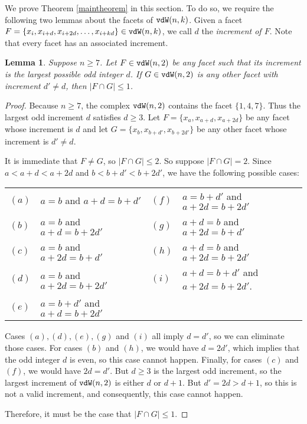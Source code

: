 \documentclass[12pt]{amsart}
\numberwithin{equation}{section}
\newtheorem{lemma}[theorem]{Lemma}
\theoremstyle{definition}
\begin{document}
We prove Theorem \ref{maintheorem} in this section.  To do
so,  we require the following two lemmas about the 
facets of ${\tt vdW}(n,k)$.   
Given  a facet $F=\{x_i,x_{i+d},x_{i+2d},\ldots,x_{i+kd}\} \in {\tt vdW}(n,k)$, 
we call $d$ the {\it increment of $F$}.  Note that every facet has an
associated increment.

\begin{lemma}\label{mainlemma1}
Suppose $n \geq 7$.   Let $F \in {\tt vdW}(n,2)$ be any facet
such that its increment is the largest possible odd integer $d$.
If $G \in {\tt vdW}(n,2)$ is any other facet with increment
$d' \neq d$, then $|F \cap G| \leq 1$.
\end{lemma}

\begin{proof}
Because $n \geq 7$, the complex ${\tt vdW}(n,2)$ contains the facet $\{1,4,7\}$.
Thus the largest odd increment $d$ satisfies $d \geq 3$.  
Let $F = \{x_a,x_{a+d},x_{a+2d}\}$ be any facet whose increment is $d$
and let $G = \{x_b,x_{b+d'},x_{b+2d'}\}$ be any other facet whose
increment is $d' \neq d$.    

It is immediate that $F \neq G$, so $|F \cap G| \leq 2$.   So
suppose $|F \cap G| = 2$.  Since $a < a+d < a+2d$ and $b < b+d'
< b+2d'$, we have the following possible cases:
\begin{center}
\begin{tabular}{llll}
$(a)$ & $a=b$ and $a+d = b+d'$  & $(f)$ & $a=b+d'$ and $a+2d = b+2d'$\\
$(b)$ & $a=b$ and $a+d = b+2d'$ & $(g)$ & $a+d=b$ and $a+2d = b+d'$ \\
$(c)$ & $a=b$ and $a+2d = b+d'$ & $(h)$ & $a+d=b$ and $a+2d = b+2d'$ \\
$(d)$ & $a=b$ and $a+2d = b+2d'$ & $(i)$ & $a+d=b+d'$ and $a+2d=b+2d'$.\\
$(e)$ & $a=b+d'$ and $a+d = b+2d'$ && \\
\end{tabular}
\end{center}
Cases $(a), (d), (e), (g)$ and $(i)$ all imply $d=d'$, so we can eliminate
those cases.  For cases $(b)$ and $(h)$,  we would have $d=2d'$, which implies
that the odd integer $d$ is even, so this case cannot happen.  
Finally, for cases $(c)$ and $(f)$, we would have 
$2d = d'$.  But $d\geq 3$ is the largest
odd increment, so the largest increment of ${\tt vdW}(n,2)$ is either
$d$ or $d+1$.  But $d' = 2d > d+1$, so this is not a valid
increment, and consequently, this case cannot happen. 

Therefore, it must be the case that $|F \cap G| \leq 1$.
\end{proof}
\end{document}
